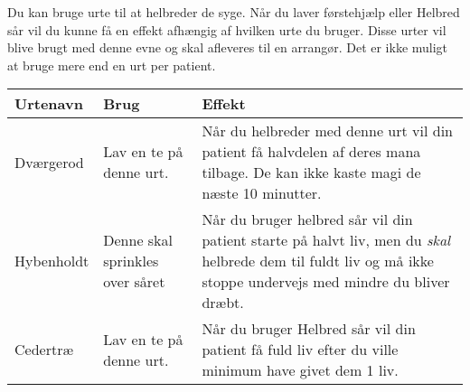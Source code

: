 Du kan bruge urte til at helbreder de syge. Når du laver førstehjælp eller Helbred sår vil du kunne få en effekt afhængig af hvilken urte du bruger. Disse urter vil blive brugt med denne evne og skal afleveres til en arrangør. Det er ikke muligt at bruge mere end en urt per patient.
\begin{table}[H]
     \centering
    \begin{tabular}{|p{}|p{}|p{}|}
    \rowcolor{cerulean!80}\hline
        Urtenavn & Brug & Effekt \\\hline
        Dværgerod & Lav en te på denne urt. & Når du helbreder med denne urt vil din patient få halvdelen af deres mana tilbage. De kan ikke kaste magi de næste 10 minutter.\\\hline
        Hybenholdt &Denne skal sprinkles over såret& Når du bruger helbred sår vil din patient starte på halvt liv, men du \emph{skal} helbrede dem til fuldt liv og må ikke stoppe undervejs med mindre du bliver dræbt.\\\hline
        Cedertræ &Lav en te på denne urt.& Når du bruger Helbred sår vil din patient få fuld liv efter du ville minimum have givet dem 1 liv.\\\hline
    \end{tabular}
\end{table}

 